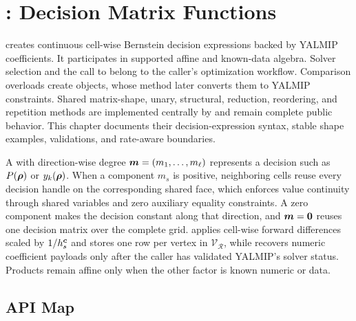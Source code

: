 \chapter{\texorpdfstring{}{pdvar}: Decision Matrix Functions}
\label{sec:pdvar}

 creates continuous cell-wise Bernstein decision expressions backed by YALMIP  coefficients. It participates in supported affine and known-data algebra. Solver selection and the call to  belong to the caller's optimization workflow. Comparison overloads create  objects, whose  method later converts them to YALMIP constraints. Shared matrix-shape, unary, structural, reduction, reordering, and repetition methods are implemented centrally by  and remain complete public  behavior. This chapter documents their decision-expression syntax, stable shape examples, validations, and rate-aware boundaries.

A  with direction-wise degree $\boldsymbol{m}=(m_1,\ldots,m_\ell)$ represents a decision such as $P(\boldsymbol{\rho})$ or $y_k(\boldsymbol{\rho})$. When a component $m_s$ is positive, neighboring cells reuse every decision handle on the corresponding shared face, which enforces value continuity through shared variables and zero auxiliary equality constraints. A zero component makes the decision constant along that direction, and $\boldsymbol{m}=\boldsymbol{0}$ reuses one decision matrix over the complete grid.  applies cell-wise forward differences scaled by $1/h_s^{\boldsymbol{c}}$ and stores one row per vertex in $\mathcal V_{\mathcal R}$, while  recovers numeric coefficient payloads only after the caller has validated YALMIP's solver status. Products remain affine only when the other factor is known numeric or  data.

\section{API Map}
\label{sec:pdvar-lookup}

